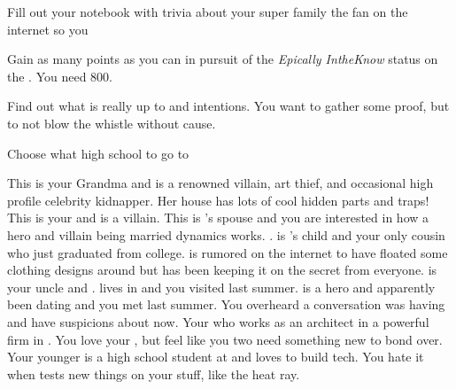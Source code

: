 \documentclass[char]{LRSguildcamp1}
\begin{document}
\begin{itemz}[Goals]
	\item Fill out your notebook with trivia about your super family the fan on the internet so you
	\item Gain as many points as you can in pursuit of the \textit{Epically IntheKnow} status on the \pTweenwebsite{}. You need 800. 
	\item Find out what \cAS{} is really up to and  intentions. You want to gather some proof, but to not blow the whistle without cause.
	\item Choose what high school to go to 
\end{itemz}

\begin{itemz}[Notes]
	\item 
\end{itemz}
\begin{contacts}
	\contact{\cGrandma{}} This is your Grandma and is a renowned villain, art thief, and occasional high profile celebrity kidnapper. Her house has lots of cool hidden parts and traps!
	\contact{\cOldest{}} This is your  \cOldest{\uncle} and is a villain. 
	\contact{\cOS{}} This is \cOldest{}'s spouse and you are interested in how a hero and villain being married dynamics works. \cOS{\uncle}.
	\contact{\cGrad{}} \cGrad{} is \cOldest{}'s child and your only cousin who just graduated from college. \cGrad{} is rumored on the internet to have floated some clothing designs around but has been keeping it on the secret from everyone.
	\contact{\cYoungest{}} \cYoungest{} is your uncle and \cYoungest{\hero}. \cYoungest{} lives in \pCityYoungest{} and you visited \cYoungest{\them} last summer.  
	\contact{\cYS{}} \cYS{} is a hero and apparently been dating \cYoungest{} and you met last summer. You overheard a conversation \cYS{} was having and have suspicions about  now.
	\contact{\cArchitect{}} Your \cArchitect{\parent} who works as an architect in a powerful firm in \pCityArchitect{}.  You love your \cArchitect{\parent}, but feel like you two need something new to bond over.
	 	\contact{\cTeen{}} Your younger \cTeen{\sibling} is a high school student at \pNormalSchool{} and loves to build tech. You hate it when \cTeen{} tests new things on your stuff, like the heat ray. 
\end{contacts}
\end{document}
